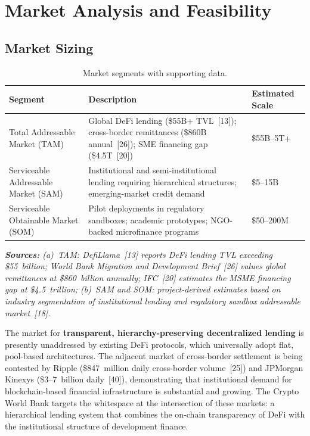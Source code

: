 \documentclass[12pt,a4paper]{report}
\newcommand{\tableheadfont}{\bfseries\small\color{PrimaryBlue}}
\newenvironment{moderntable}[1][H]{%
    \begin{table}[#1]\centering\small%
    \renewcommand{\arraystretch}{1.35}%
}{%
    \end{table}%
}
\begin{document}
\chapter{Market Analysis and Feasibility}

\section{Market Sizing}

\begin{moderntable}
\caption{Market segments with supporting data.}
\begin{tabular}{@{} >{\raggedright}p{4cm} >{\raggedright}p{5cm} >{\raggedright\arraybackslash}p{3cm} @{}}
\toprule
\tableheadfont Segment & \tableheadfont Description & \tableheadfont Estimated Scale \\
\midrule
\rowcolor{RowShade}
Total Addressable Market (TAM) & Global DeFi lending (\$55B+ TVL~[13]); cross-border remittances (\$860B annual~[26]); SME financing gap (\$4.5T~[20]) & \$55B--5T+ \\
Serviceable Addressable Market (SAM) & Institutional and semi-institutional lending requiring hierarchical structures; emerging-market credit demand & \$5--15B \\
\rowcolor{RowShade}
Serviceable Obtainable Market (SOM) & Pilot deployments in regulatory sandboxes; academic prototypes; NGO-backed microfinance programs & \$50--200M \\
\bottomrule
\end{tabular}
\end{moderntable}

\vspace{4pt}
\noindent\textit{\small\textbf{Sources:} (a)~TAM: DefiLlama~[13] reports DeFi lending TVL exceeding \$55~billion; World Bank Migration and Development Brief~[26] values global remittances at \$860~billion annually; IFC~[20] estimates the MSME financing gap at \$4.5~trillion; (b)~SAM and SOM: project-derived estimates based on industry segmentation of institutional lending and regulatory sandbox addressable market~[18].}

The market for \textbf{transparent, hierarchy-preserving decentralized lending} is presently unaddressed by existing DeFi protocols, which universally adopt flat, pool-based architectures. The adjacent market of cross-border settlement is being contested by Ripple (\$847~million daily cross-border volume~[25]) and JPMorgan Kinexys (\$3--7~billion daily~[40]), demonstrating that institutional demand for blockchain-based financial infrastructure is substantial and growing. The Crypto World Bank targets the whitespace at the intersection of these markets: a hierarchical lending system that combines the on-chain transparency of DeFi with the institutional structure of development finance.
\end{document}
